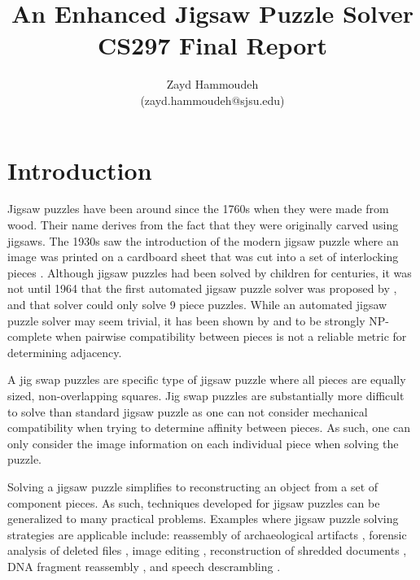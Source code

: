 \documentclass{report}
\title{An Enhanced Jigsaw Puzzle Solver \\[1in]
	   CS297 Final Report}
\author{
  Zayd Hammoudeh \\
  (zayd.hammoudeh@sjsu.edu)
  }
\begin{document}
\maketitle


\renewcommand{\contentsname}{Table of Contents} %
\tableofcontents{\protect\newpage}

\listoffigures
\newpage

\listoftables
\newpage
 

\renewcommand\thesection{\arabic{section}}

\section{Introduction}\label{sec:introduction}

Jigsaw puzzles have been around since the 1760s when they were made from wood.  Their name derives from the fact that they were originally carved using jigsaws.   The 1930s saw the introduction of the modern jigsaw puzzle where an image was printed on a cardboard sheet that was cut into a set of interlocking pieces \cite{williams1990, williams2004}.  Although jigsaw puzzles had been solved by children for centuries, it was not until 1964 that the first automated jigsaw puzzle solver was proposed by \cite{freeman1964}, and that solver could only solve 9 piece puzzles.  While an automated jigsaw puzzle solver may seem trivial, it has been shown by \cite{altman1990} and \cite{demaine2007} to be strongly NP-complete when pairwise compatibility between pieces is not a reliable metric for determining adjacency.

A jig swap puzzles are specific type of jigsaw puzzle where  all pieces are equally sized, non-overlapping squares.  Jig swap puzzles are substantially more difficult to solve than standard jigsaw puzzle as one can not consider mechanical compatibility when trying to determine affinity between pieces.  As such, one can only consider the image information on each individual piece when solving the puzzle.  

Solving a jigsaw puzzle simplifies to reconstructing an object from a set of component pieces.  As such, techniques developed for jigsaw puzzles can be generalized to many practical problems.  Examples where jigsaw puzzle solving strategies are applicable include: reassembly of archaeological artifacts \cite{brown2008, koller2006}, forensic analysis of deleted files \cite{garfinkel2010}, image editing \cite{cho2008}, reconstruction of shredded documents \cite{zhu2008}, DNA fragment reassembly \cite{marande2007}, and speech descrambling \cite{zhao2007}.
\end{document}
